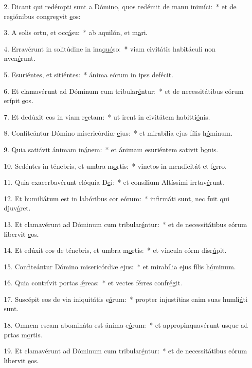 2. Dicant qui redémpti sunt a Dómino, quos redémit de manu inim\uline{í}ci:~* et de regiónibus congregvit \uline{e}os:\par 
3. A solis ortu, et occ\uline{á}su:~* ab aquilón, et m\uline{a}ri.\par 
4. Erravérunt in solitúdine in ina\uline{quó}so:~* viam civitátis habitáculi non nven\uline{é}runt.\par 
5. Esuriéntes, et siti\uline{é}ntes:~* ánima eórum in ipss def\uline{é}cit.\par 
6. Et clamavérunt ad Dóminum cum tribular\uline{é}ntur:~* et de necessitátibus eórum erípit \uline{e}os.\par 
7. Et dedúxit eos in viam r\uline{e}ctam:~* ut irent in civitátem habitti\uline{ó}nis.\par 
8. Confiteántur Dómino misericórdiæ \uline{e}jus:~* et mirabília ejus fílis h\uline{ó}minum.\par 
9. Quia satiávit ánimam in\uline{á}nem:~* et ánimam esuriéntem sativit b\uline{o}nis.\par 
10. Sedéntes in ténebris, et umbra m\uline{o}rtis:~* vinctos in mendicitát et f\uline{e}rro.\par 
11. Quia exacerbavérunt elóquia D\uline{e}i:~* et consílium Altíssimi irrtav\uline{é}runt.\par 
12. Et humiliátum est in labóribus cor e\uline{ó}rum:~* infirmáti sunt, nec fuit qui djuv\uline{á}ret.\par 
13. Et clamavérunt ad Dóminum cum tribular\uline{é}ntur:~* et de necessitátibus eórum libervit \uline{e}os.\par 
14. Et edúxit eos de ténebris, et umbra m\uline{o}rtis:~* et víncula eórm disr\uline{ú}pit.\par 
15. Confiteántur Dómino misericórdiæ \uline{e}jus:~* et mirabília ejus fílis h\uline{ó}minum.\par 
16. Quia contrívit portas \uline{ǽ}reas:~* et vectes férres confr\uline{é}git.\par 
17. Suscépit eos de via iniquitátis e\uline{ó}rum:~* propter injustítias enim suas humli\uline{á}ti sunt.\par 
18. Omnem escam abomináta est ánima e\uline{ó}rum:~* et appropinquavérunt usque ad prtas m\uline{o}rtis.\par 
19. Et clamavérunt ad Dóminum cum tribular\uline{é}ntur:~* et de necessitátibus eórum libervit \uline{e}os.\par 

